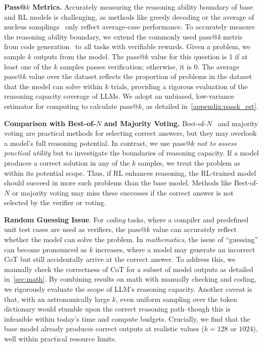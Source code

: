 \textbf{Pass@$k$ Metrics.}
Accurately measuring the reasoning ability boundary of base and RL models is challenging, as methods like greedy decoding or the average of nucleus samplings~\cite{holtzman2019topp} only reflect average-case performance.
To accurately measure the reasoning ability boundary, 
we extend the commonly used pass@\textit{k} metric from code generation~\cite{chen2021evaluating} to all tasks with verifiable rewards. Given a problem, we sample $k$ outputs from the model. 
The pass@$k$ value for this question is 1 if at least one of the $k$ samples passes verification; otherwise, it is 0.
The average pass@$k$ value over the dataset reflects the proportion of problems in the dataset that the model can solve within $k$ trials, providing a rigorous evaluation of the reasoning capacity coverage of LLMs.
We adopt an unbiased, low-variance estimator for computing to calculate pass@$k$, as detailed in~\cref{appendix:passk_est}.

\textbf{Comparison with Best-of-$N$ and Majority Voting.}
Best-of-$N$~\cite{cobbe2021gsm8k} and majority voting are practical methods for selecting correct answers, but they may overlook a model's full reasoning potential. In contrast, we use pass@$k$ \textit{not to assess practical utility} but to investigate the boundaries of reasoning capacity. 
If a model produces a correct solution in any of the $k$ samples, we treat the problem as within its potential scope. Thus, if RL enhances reasoning, the RL-trained model should succeed in more such problems than the base model. 
Methods like Best-of-$N$ or majority voting may miss these successes if the correct answer is not selected by the verifier or voting.


\textbf{Random Guessing Issue}. 
For \textit{coding} tasks, where a compiler and predefined unit test cases are used as verifiers, the pass@$k$ value can accurately reflect whether the model can solve the problem. 
In \textit{mathematics}, the issue of ``guessing'' can become pronounced as $k$ increases, where a model may generate an incorrect CoT but still accidentally arrive at the correct answer.
To address this, we manually check the correctness of CoT for a subset of model outputs as detailed in~\cref{sec:math}. 
By combining results on math with manually checking and coding, we rigorously evaluate the scope of LLM's reasoning capacity. 
Another caveat is that, with an astronomically large $k$, even uniform sampling over the token dictionary would stumble upon the correct reasoning path--though this is infeasible within today's time and compute budgets. Crucially, we find that the base model already produces correct outputs at realistic values ($k = 128$ or $1024$), well within practical resource limits.



